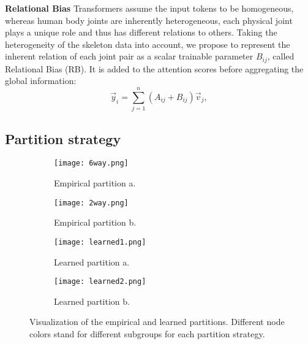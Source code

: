 \documentclass[10pt,twocolumn,letterpaper]{article}
\begin{document}
\noindent \textbf{Relational Bias}
Transformers assume the input tokens to be homogeneous, whereas human body joints are inherently heterogeneous, \eg each physical joint plays a unique role and thus has different relations to others.
Taking the heterogeneity of the skeleton data into account, we propose to represent the inherent relation of each joint pair as a scalar trainable parameter $B_{ij}$, called Relational Bias (RB).  It is added to the attention scores before aggregating the global information:
\begin{equation}
\label{eq:7}
\vec{y}_i = \sum_{j=1}^n (A_{ij} + B_{ij}) \vec{v}_j
,
\end{equation}

\subsection{Partition strategy}
\label{sec:learn}

\begin{figure}[]
  \centering
  \begin{subfigure}[t]{0.18\textwidth}
      \centering
      \texttt{[image: 6way.png]}
      \caption{Empirical partition a.}
      \label{fig: 2}
  \end{subfigure}
    \hspace{1.5cm}
  \begin{subfigure}[t]{0.18\textwidth}
      \centering
      \texttt{[image: 2way.png]}
      \caption{Empirical partition b.}
      \label{fig:3}
  \end{subfigure}
  \hspace{0.6cm}
  \begin{subfigure}[t]{0.18\textwidth}
      \centering
  \texttt{[image: learned1.png]}
      \caption{Learned partition a.}
      \label{fig:4}
  \end{subfigure}
        \hspace{1.5cm}
  \begin{subfigure}[t]{0.18\textwidth}
      \centering
  \texttt{[image: learned2.png]}
      \caption{Learned  partition b.}
      \label{fig:leg}
  \end{subfigure}
     \caption{Visualization of the empirical and learned partitions. Different node colors stand for different subgroups for each partition strategy.}
     \label{fig:2}
\end{figure}
\end{document}
